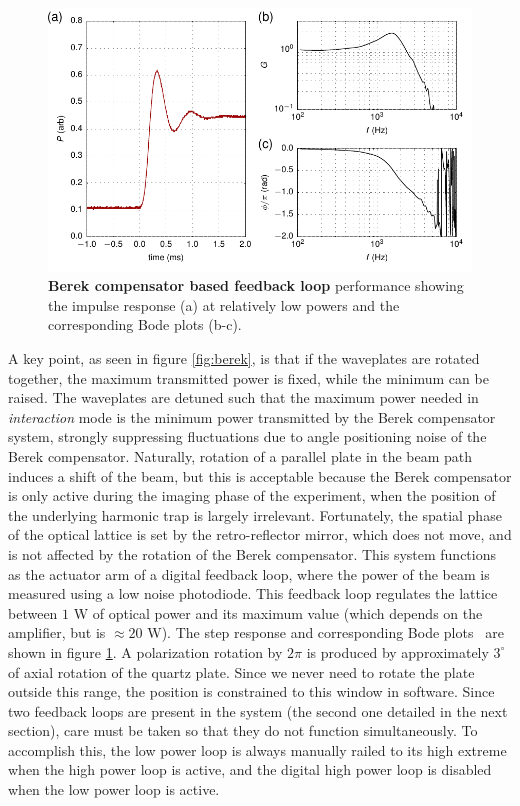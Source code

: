 \documentclass[twocolumn,aps,pra,showpacs,preprintnumbers,bibnotes]{revtex4-1}
\begin{document}
\begin{figure}
  \begin{center}
    \includegraphics{fig/step_response.pdf}
    \caption{\textbf{Berek compensator based feedback loop} performance showing the impulse response (a) at relatively low powers and the corresponding Bode plots (b-c).}\label{fig:berek_step_response}
  \end{center}
\end{figure}
A key point, as seen in figure \ref{fig:berek}, is that if the waveplates are rotated together, the maximum transmitted power is fixed, while the minimum can be raised.
The waveplates are detuned such that the maximum power needed in \textit{interaction} mode is the minimum power transmitted by the Berek compensator system, strongly suppressing fluctuations due to angle positioning noise of the Berek compensator. 
Naturally, rotation of a parallel plate in the beam path induces a shift of the beam, but this is acceptable because the Berek compensator is only active during the imaging phase of the experiment, when the position of the underlying harmonic trap is largely irrelevant.
Fortunately, the spatial phase of the optical lattice is set by the retro-reflector mirror, which does not move, and is not affected by the rotation of the Berek compensator.
This system functions as the actuator arm of a digital feedback loop, where the power of the beam is measured using a low noise photodiode. This feedback loop regulates the lattice between $1$ W of optical power and its maximum value (which depends on the amplifier, but is $\approx20$ W).
The step response and corresponding Bode plots~\cite{Bechhoefer2005} are shown in figure \ref{fig:berek_step_response}.
A polarization rotation by $2 \pi$ is produced by approximately $3^\circ$ of axial rotation of the quartz plate. 
Since we never need to rotate the plate outside this range, the position is constrained to this window in software.
Since two feedback loops are present in the system (the second one detailed in the next section), care must be taken so that they do not function simultaneously. 
To accomplish this, the low power loop is always manually railed to its high extreme when the high power loop is active, and the digital high power loop is disabled when the low power loop is active.
\end{document}
